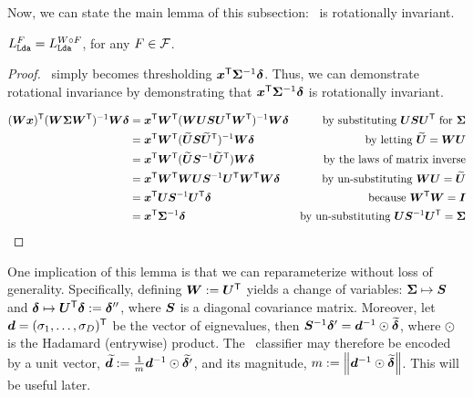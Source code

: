 \documentclass[10pt]{article}
\begin{document}
Now, we can state the main lemma of this subsection:  \Lda~is rotationally invariant.
\begin{lem} \label{l:rot}
$L_{{\sc \texttt{Lda}}}^F = L_{{\sc \texttt{Lda}}}^{W \circ F}$, for any $F \in \mathcal{F}$.
\end{lem}

\begin{proof}
\Lda~simply becomes thresholding $\boldsymbol{x}^{\mathsf{T}} \boldsymbol{\Sigma}^{-1} \boldsymbol{\delta}$.  Thus, we can demonstrate rotational invariance by demonstrating that $\boldsymbol{x}^{\mathsf{T}} \boldsymbol{\Sigma}^{-1} \boldsymbol{\delta}$ is rotationally invariant.


\begin{align*}
(\bW \bx) \T  (\bW \bSig \bW\T )^{-1} \bW \bdel  %
&= \bx\T \bW\T  (\bW \bU \bS \bU\T \bW\T)^{-1} \bW \bdel & \text{by substituting $\bU \bS \bU\T$ for $\bSig$} \\
&= \bx\T \bW\T  (\mt{\bU} \bS \mt{\bU}\T)^{-1} \bW \bdel & \text{by letting $\mt{\bU}=\bW \bU$} \\
&= \bx\T \bW\T  (\mt{\bU} \bS^{-1} \mt{\bU}\T) \bW \bdel & \text{by the laws of matrix inverse} \\
&= \bx\T \bW\T  \bW \bU \bS^{-1}  \bU\T \bW\T \bW \bdel & \text{by un-substituting $\bW \bU=\mt{\bU}$} \\
&= \bx\T  \bU \bS^{-1}  \bU\T  \bdel  & \text{because $\bW\T \bW = \bI$} \\
&= \bx\T   \bSig^{-1} \bdel & \text{by un-substituting $\bU \bS^{-1} \bU\T = \bSig$}
\end{align*}
\end{proof}

One implication of this lemma is that we can reparameterize without loss of generality.  Specifically, defining $\boldsymbol{W} := \boldsymbol{U}^{\mathsf{T}}$ yields a change of variables: $\boldsymbol{\Sigma} \mapsto \boldsymbol{S}$ and $\boldsymbol{\delta} \mapsto \boldsymbol{U}^{\mathsf{T}} \boldsymbol{\delta} := \boldsymbol{\delta}''$, where $\boldsymbol{S}$ is a diagonal covariance matrix.  Moreover, let $\boldsymbol{d}=(\sigma_1,\ldots, \sigma_D)^{\mathsf{T}}$ be the vector of eignevalues, then $\boldsymbol{S}^{-1} {\boldsymbol{\delta}'}=\boldsymbol{d}^{-1} \odot \widetilde{\boldsymbol{\delta}}$, where $\odot$ is the Hadamard (entrywise) product.  The \Lda~classifier may therefore be encoded by a unit vector, $\widetilde{\boldsymbol{d}}:= \frac{1}{m} \boldsymbol{d}^{-1} \odot \widetilde{\boldsymbol{\delta}'}$, and its magnitude, $m:=\left \lVert\boldsymbol{d}^{-1} \odot \widetilde{\boldsymbol{\delta}} \right \rVert$.
This will be useful later.
\end{document}
